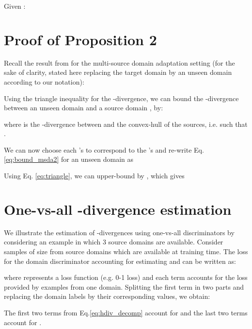 \documentclass{article}
\begin{document}
Given  :



\section{Proof of Proposition 2}
Recall the result from \cite{zhao2018adversarial} for the multi-source domain adaptation setting (for the sake of clarity, stated here replacing the target domain by an unseen domain according to our notation):


Using the triangle inequality for the -divergence, we can bound the -divergence between an unseen domain  and a source domain ,    by:

where  is the -divergence between  and the convex-hull of the sources, i.e.  such that .

We can now choose each 's to correspond to the 's and re-write Eq. \ref{eq:bound_msda2} for an unseen domain  as



Using Eq. \ref{eq:triangle}, we can upper-bound  by , which gives  




\section{One-vs-all -divergence estimation}
We illustrate the estimation of -divergences using one-vs-all discriminators by considering an example in which 3 source domains are available. Consider samples of size  from  source domains which are available at training time. The loss  for the domain discriminator  accounting for estimating  and  can be written as:


 
where  represents a loss function (e.g. 0-1 loss) and each term accounts for the loss provided by examples from one domain. Splitting the first term in two parts and replacing the domain labels  by their corresponding values, we obtain:


The first two terms from Eq.\ref{eq:hdiv_decomp} account for  and the last two terms account for .
\end{document}
